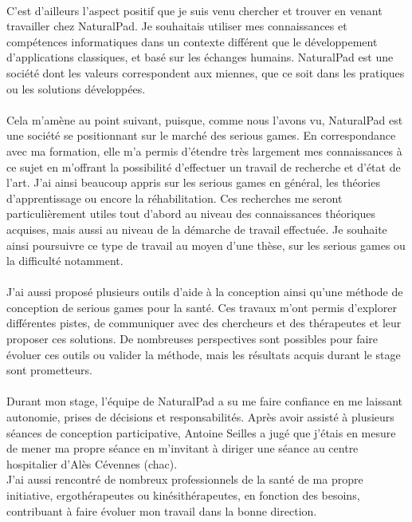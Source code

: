 \paragraph{} C'est d'ailleurs l'aspect positif que je suis venu chercher et trouver en venant travailler chez NaturalPad. Je souhaitais utiliser mes connaissances et compétences informatiques dans un contexte différent que le développement d'applications classiques, et basé sur les échanges humains. NaturalPad est une société dont les valeurs correspondent aux miennes, que ce soit dans les pratiques ou les solutions développées.

\paragraph{} Cela m'amène au point suivant, puisque, comme nous l'avons vu, NaturalPad est une société se positionnant sur le marché des serious games. En correspondance avec ma formation, elle m'a permis d'étendre très largement mes connaissances à ce sujet en m'offrant la possibilité d'effectuer un travail de recherche et d'état de l'art. J'ai ainsi beaucoup appris sur les serious games en général, les théories d'apprentissage ou encore la réhabilitation. Ces recherches me seront particulièrement utiles tout d'abord au niveau des connaissances théoriques acquises, mais aussi au niveau de la démarche de travail effectuée. Je souhaite ainsi poursuivre ce type de travail au moyen d'une thèse, sur les serious games ou la difficulté notamment. 

\paragraph{} J'ai aussi proposé plusieurs outils d'aide à la conception ainsi qu'une méthode de conception  de serious games pour la santé. Ces travaux m'ont permis d'explorer différentes pistes, de communiquer avec des chercheurs et des thérapeutes et 
leur proposer ces solutions. De nombreuses perspectives sont possibles pour faire évoluer ces outils ou valider la méthode, mais les résultats acquis durant le stage sont prometteurs.

\paragraph{} Durant mon stage, l'équipe de NaturalPad a su me faire confiance en me laissant autonomie, prises de décisions et responsabilités. Après avoir assisté à plusieurs séances de conception participative, Antoine Seilles a jugé que j'étais en mesure de mener ma propre séance en m'invitant à diriger une séance au centre hospitalier d'Alès Cévennes (\gls{chac}). \\
J'ai aussi rencontré de nombreux professionnels de la santé de ma propre initiative, ergothérapeutes ou kinésithérapeutes, en fonction des besoins, contribuant à faire évoluer mon travail dans la bonne direction.

